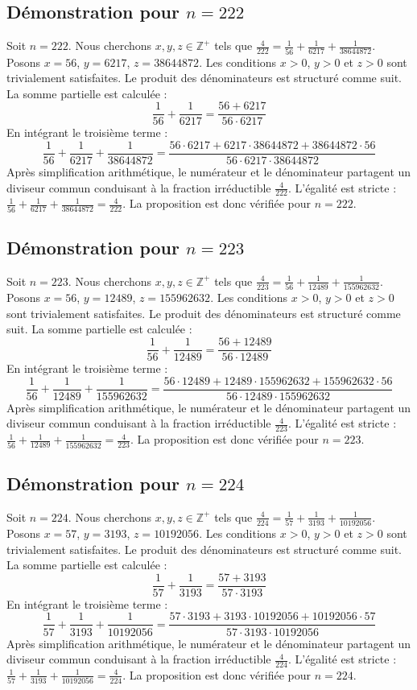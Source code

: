 \documentclass[11pt,a4paper]{article}
\begin{document}
\subsection{Démonstration pour $n = 222$}
Soit $n = 222$. Nous cherchons $x, y, z \in \mathbb{Z}^{+}$ tels que $\frac{4}{222} = \frac{1}{56} + \frac{1}{6217} + \frac{1}{38644872}$.
Posons $x = 56$, $y = 6217$, $z = 38644872$.
Les conditions $x > 0$, $y > 0$ et $z > 0$ sont trivialement satisfaites.
Le produit des dénominateurs est structuré comme suit. La somme partielle est calculée :
$$ \frac{1}{56} + \frac{1}{6217} = \frac{56+6217}{56 \cdot 6217} $$
En intégrant le troisième terme :
$$ \frac{1}{56} + \frac{1}{6217} + \frac{1}{38644872} = \frac{56 \cdot 6217 + 6217 \cdot 38644872 + 38644872 \cdot 56}{56 \cdot 6217 \cdot 38644872} $$
Après simplification arithmétique, le numérateur et le dénominateur partagent un diviseur commun conduisant à la fraction irréductible $\frac{4}{222}$.
L'égalité est stricte : $\frac{1}{56} + \frac{1}{6217} + \frac{1}{38644872} = \frac{4}{222}$.
La proposition est donc vérifiée pour $n = 222$.
\subsection{Démonstration pour $n = 223$}
Soit $n = 223$. Nous cherchons $x, y, z \in \mathbb{Z}^{+}$ tels que $\frac{4}{223} = \frac{1}{56} + \frac{1}{12489} + \frac{1}{155962632}$.
Posons $x = 56$, $y = 12489$, $z = 155962632$.
Les conditions $x > 0$, $y > 0$ et $z > 0$ sont trivialement satisfaites.
Le produit des dénominateurs est structuré comme suit. La somme partielle est calculée :
$$ \frac{1}{56} + \frac{1}{12489} = \frac{56+12489}{56 \cdot 12489} $$
En intégrant le troisième terme :
$$ \frac{1}{56} + \frac{1}{12489} + \frac{1}{155962632} = \frac{56 \cdot 12489 + 12489 \cdot 155962632 + 155962632 \cdot 56}{56 \cdot 12489 \cdot 155962632} $$
Après simplification arithmétique, le numérateur et le dénominateur partagent un diviseur commun conduisant à la fraction irréductible $\frac{4}{223}$.
L'égalité est stricte : $\frac{1}{56} + \frac{1}{12489} + \frac{1}{155962632} = \frac{4}{223}$.
La proposition est donc vérifiée pour $n = 223$.
\subsection{Démonstration pour $n = 224$}
Soit $n = 224$. Nous cherchons $x, y, z \in \mathbb{Z}^{+}$ tels que $\frac{4}{224} = \frac{1}{57} + \frac{1}{3193} + \frac{1}{10192056}$.
Posons $x = 57$, $y = 3193$, $z = 10192056$.
Les conditions $x > 0$, $y > 0$ et $z > 0$ sont trivialement satisfaites.
Le produit des dénominateurs est structuré comme suit. La somme partielle est calculée :
$$ \frac{1}{57} + \frac{1}{3193} = \frac{57+3193}{57 \cdot 3193} $$
En intégrant le troisième terme :
$$ \frac{1}{57} + \frac{1}{3193} + \frac{1}{10192056} = \frac{57 \cdot 3193 + 3193 \cdot 10192056 + 10192056 \cdot 57}{57 \cdot 3193 \cdot 10192056} $$
Après simplification arithmétique, le numérateur et le dénominateur partagent un diviseur commun conduisant à la fraction irréductible $\frac{4}{224}$.
L'égalité est stricte : $\frac{1}{57} + \frac{1}{3193} + \frac{1}{10192056} = \frac{4}{224}$.
La proposition est donc vérifiée pour $n = 224$.
\end{document}
